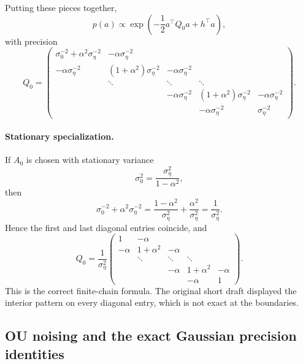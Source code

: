 \documentclass[11pt,a4paper]{article}
\begin{document}
Putting these pieces together,
\begin{equation}
p(a) \propto \exp\!\left(-\frac12 a^\top Q_0 a + h^\top a\right),
\label{eq:gauss-quad-form}
\end{equation}
with precision
\begin{equation}
Q_0 =
\begin{pmatrix}
\sigma_0^{-2}+\alpha^2 \sigma_\eta^{-2} & -\alpha \sigma_\eta^{-2} & & & \\
-\alpha \sigma_\eta^{-2} & (1+\alpha^2)\sigma_\eta^{-2} & -\alpha \sigma_\eta^{-2} & & \\
& \ddots & \ddots & \ddots & \\
& & -\alpha \sigma_\eta^{-2} & (1+\alpha^2)\sigma_\eta^{-2} & -\alpha \sigma_\eta^{-2}\\
& & & -\alpha \sigma_\eta^{-2} & \sigma_\eta^{-2}
\end{pmatrix}.
\label{eq:Q0-general}
\end{equation}

\paragraph{Stationary specialization.}
If $A_0$ is chosen with stationary variance
\begin{equation}
\sigma_0^2 = \frac{\sigma_\eta^2}{1-\alpha^2},
\label{eq:stationary-variance}
\end{equation}
then
\[
\sigma_0^{-2}+\alpha^2 \sigma_\eta^{-2}
=
\frac{1-\alpha^2}{\sigma_\eta^2} + \frac{\alpha^2}{\sigma_\eta^2}
=
\frac{1}{\sigma_\eta^2}.
\]
Hence the first and last diagonal entries coincide, and
\begin{equation}
Q_0 =
\frac{1}{\sigma_\eta^2}
\begin{pmatrix}
1 & -\alpha & & & \\
-\alpha & 1+\alpha^2 & -\alpha & & \\
& \ddots & \ddots & \ddots & \\
& & -\alpha & 1+\alpha^2 & -\alpha\\
& & & -\alpha & 1
\end{pmatrix}.
\label{eq:Q0-stationary}
\end{equation}
This is the correct finite-chain formula. The original short draft displayed the interior pattern on every diagonal entry, which is not exact at the boundaries.

\subsection{OU noising and the exact Gaussian precision identities}
\label{sec:ou-identities}
\end{document}
